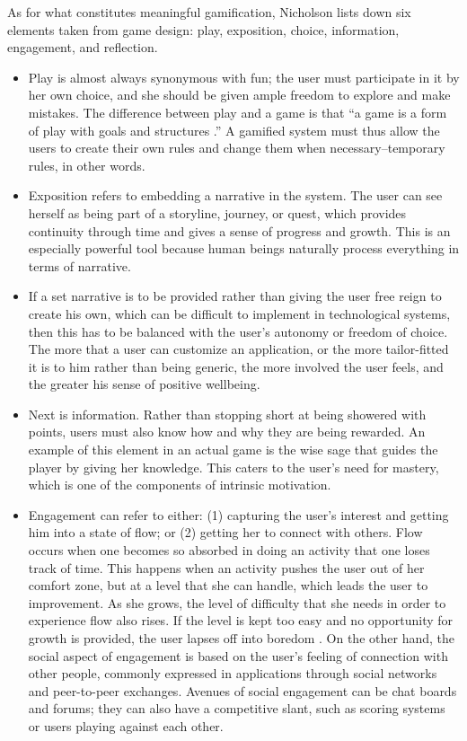 As for what constitutes meaningful gamification, Nicholson lists down six elements taken from game design: play, exposition, choice, information, engagement, and reflection.
\begin{itemize}
\item Play is almost always synonymous with fun; the user must participate in it by her own choice, and she should be given ample freedom to explore and make mistakes. The difference between play and a game is that “a game is a form of play with goals and structures \cite{maroneykevin2001}.” A gamified system must thus allow the users to create their own rules and change them when necessary--temporary rules, in other words.
\item Exposition refers to embedding a narrative in the system. The user can see herself as being part of a storyline, journey, or quest, which provides continuity through time and gives a sense of progress and growth. This is an especially powerful tool because human beings naturally process everything in terms of narrative.
\item If a set narrative is to be provided rather than giving the user free reign to create his own, which can be difficult to implement in technological systems, then this has to be balanced with the user’s autonomy or freedom of choice. The more that a user can customize an application, or the more tailor-fitted it is to him rather than being generic, the more involved the user feels, and the greater his sense of positive wellbeing.
\item Next is information. Rather than stopping short at being showered with points, users must also know how and why they are being rewarded. An example of this element in an actual game is the wise sage that guides the player by giving her knowledge. This caters to the user’s need for mastery, which is one of the components of intrinsic motivation.
\item Engagement can refer to either: (1) capturing the user’s interest and getting him into a state of flow; or (2) getting her to connect with others. Flow occurs when one becomes so absorbed in doing an activity that one loses track of time. This happens when an activity pushes the user out of her comfort zone, but at a level that she can handle, which leads the user to improvement. As she grows, the level of difficulty that she needs in order to experience flow also rises. If the level is kept too easy and no opportunity for growth is provided, the user lapses off into boredom \cite{mihalycsikszentmihalyi2008}. On the other hand, the social aspect of engagement is based on the user’s feeling of connection with other people, commonly expressed in applications through social networks and peer-to-peer exchanges. Avenues of social engagement can be chat boards and forums; they can also have a competitive slant, such as scoring systems or users playing against each other.

\end{itemize}
